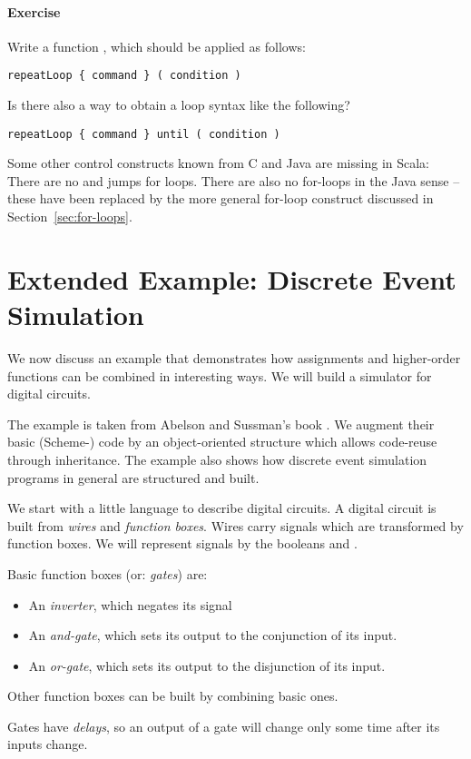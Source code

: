 \documentclass[a4paper,12pt,twoside,titlepage]{book}
\newcommand{\exercise}{\paragraph{Exercise}}
\begin{document}
{\exercise Write a function , which should be 
applied as follows:
\begin{lstlisting}
repeatLoop { command } ( condition )
\end{lstlisting}
Is there also a way to obtain a loop syntax like the following?
\begin{lstlisting}
repeatLoop { command } until ( condition )
\end{lstlisting}
Some other control constructs known from C and Java are missing in
Scala: There are no  and  jumps for loops.
There are also no for-loops in the Java sense -- these have been
replaced by the more general for-loop construct discussed in
Section~\ref{sec:for-loops}.

\section{Extended Example: Discrete Event Simulation}

We now discuss an example that demonstrates how assignments and
higher-order functions can be combined in interesting ways.  
We will build a simulator for digital circuits.

The example is taken from Abelson and Sussman's book
\cite{abelson-sussman:structure}. We augment their basic (Scheme-)
code by an object-oriented structure which allows code-reuse through
inheritance. The example also shows how discrete event simulation programs
in general are structured and built.

We start with a little language to describe digital circuits.
A digital circuit is built from {\em wires} and {\em function boxes}.
Wires carry signals which are transformed by function boxes.
We will represent signals by the booleans  and
.

Basic function boxes (or: {\em gates}) are:
\begin{itemize}
\item An \emph{inverter}, which negates its signal
\item An \emph{and-gate}, which sets its output to the conjunction of its input.
\item An \emph{or-gate}, which sets its output to the disjunction of its
input.
\end{itemize}
Other function boxes can be built by combining basic ones.

Gates have {\em delays}, so an output of a gate will change only some
time after its inputs change.

}
\end{document}

